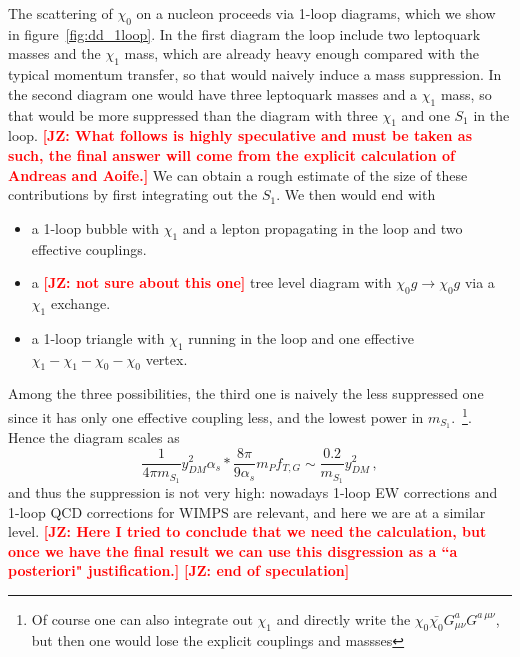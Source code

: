 \documentclass[11pt]{cernrep}
\newcommand{\be}{\begin{equation}}
\newcommand{\ee}{\end{equation}}
\def\JZ#1{{\bf  \textcolor{red}{[JZ: {#1}]}}}
\begin{document}
The scattering of $\chi_0$ on a nucleon proceeds via 1-loop diagrams, which we show in figure~\ref{fig:dd_1loop}. In the first diagram the loop include two leptoquark masses and the $\chi_1$ mass, which are already heavy enough compared with the typical momentum transfer, so that would naively induce a mass suppression. In the second diagram one would have three leptoquark masses and a $\chi_1$ mass, so that would be more suppressed than the diagram with three $\chi_1$ and one $S_1$ in the loop.
\JZ{What follows is highly speculative and must be taken as such, the final answer will come from the explicit calculation of Andreas and Aoife.}
We can obtain a rough estimate of the size of these contributions by first integrating out the $S_1$. We then would end with 
\begin{itemize}
\item a 1-loop bubble with $\chi_1$ and a lepton propagating in the loop and two effective couplings.
\item a \JZ{not sure about this one} tree level diagram with $\chi_0 g \to \chi_0 g$ via a $\chi_1$ exchange.
\item a 1-loop triangle with $\chi_1$ running in the loop and one effective $\chi_1-\chi_1-\chi_0-\chi_0$ vertex.
\end{itemize}
Among the three possibilities, the third one is naively the less suppressed one since it has only one effective coupling less, and the lowest power in $m_{S_1}$.~\footnote{Of course one can also integrate out $\chi_1$ and directly write the $\chi_0 \bar{\chi_0} G^a_{\mu \nu} G^{a \, \mu \nu}$, but then one would lose the explicit couplings and massses}. Hence the diagram scales as 
\be
\frac{1}{4 \pi m_{S_1}} y_{DM}^2 \alpha_s * \frac{8 \pi}{9 \alpha_s} m_P f_{T,G} \sim \frac{0.2}{m_{S_1}} y_{DM}^2 \, ,
\ee 
and thus the suppression is not very high: nowadays 1-loop EW corrections and 1-loop QCD corrections for WIMPS are relevant, and here we are at a similar level. \JZ{Here I tried to conclude that we need the calculation, but once we have the final result we can use this disgression as a ``a posteriori" justification.}
\JZ{end of speculation}
\end{document}
